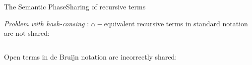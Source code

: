\begin{frame}{The Semantic Phase}{Sharing of recursive terms}

\emph{Problem with hash-consing} : $\alpha-$equivalent recursive terms in standard notation are not shared:

\begin{columns}
\begin{center}\end{center}
\begin{center}\end{center}
\end{columns}

\vspace{0.25cm}
Open terms in de Bruijn notation are incorrectly shared:
 
\begin{columns}
\begin{center}\end{center}
\begin{center}\end{center}
\end{columns}

\end{frame}


